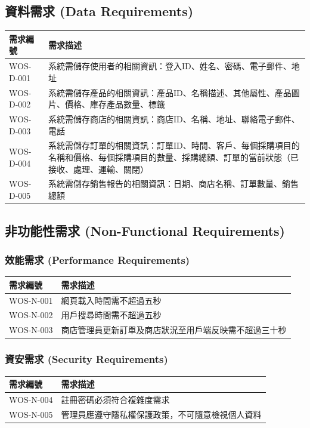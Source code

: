 \documentclass[a4paper, 12pt]{article}
\begin{document}
\subsection{資料需求 (Data Requirements)}
\noindent\begin{tabular}{|l| p{32em}|}
    \hline
    需求編號 & 需求描述 \\
    \hline
    WOS-D-001 & 系統需儲存使用者的相關資訊：登入ID、姓名、密碼、電子郵件、地址 \\
    \hline
    WOS-D-002 & 系統需儲存產品的相關資訊：產品ID、名稱描述、其他屬性、產品圖片、價格、庫存產品數量、標籤 \\
    \hline
    WOS-D-003 & 系統需儲存商店的相關資訊：商店ID、名稱、地址、聯絡電子郵件、電話 \\
    \hline
    WOS-D-004 & 系統需儲存訂單的相關資訊：訂單ID、時間、客戶、每個採購項目的名稱和價格、每個採購項目的數量、採購總額、訂單的當前狀態（已接收、處理、運輸、關閉） \\
    \hline
    WOS-D-005 & 系統需儲存銷售報告的相關資訊：日期、商店名稱、訂單數量、銷售總額 \\
    \hline
\end{tabular}

\subsection{非功能性需求 (Non-Functional Requirements)}
\subsubsection{效能需求 (Performance Requirements)}
\noindent\begin{tabular}{|l| p{32em}|}
    \hline
    需求編號 & 需求描述 \\
    \hline
    WOS-N-001 & 網頁載入時間需不超過五秒 \\
    \hline
    WOS-N-002 & 用戶搜尋時間需不超過五秒 \\
    \hline
    WOS-N-003 & 商店管理員更新訂單及商店狀況至用戶端反映需不超過三十秒 \\
    \hline
\end{tabular}
\subsubsection{資安需求 (Security Requirements)}
\noindent\begin{tabular}{ | p{6.5em} | p{32em} |}
    \hline
    需求編號 & 需求描述 \\
    \hline
    WOS-N-004 & 註冊密碼必須符合複雜度需求 \\
    \hline
    WOS-N-005 & 管理員應遵守隱私權保護政策，不可隨意檢視個人資料 \\
    \hline
\end{tabular}
\end{document}
